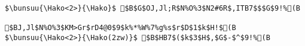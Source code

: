 \begin{verbatim}
$\bunsuu{\Hako<2>}{\Hako}$ $B$G$OJ,Jl;R$N%O%3$N2#6R$,ITB7$$$G$9!%(B

$BJ,Jl$N%O%3$KM>Gr$rD4@0$9$k%*%W%7%g%s$r$D$1$k$H!$(B
$\bunsuu{\Hako<2>}{\Hako(2zw)}$ $B$HB7$($k$3$H$,$G$-$^$9!%(B
\end{verbatim}
